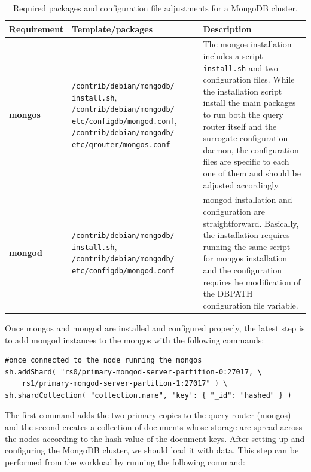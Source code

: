 			\begin{table}[htdp]
				\begin{center}
\caption{Required packages and configuration file adjustments for a MongoDB cluster.}
  \label{tab:common_install_conf_mm}
					\begin{tabular}{R{2.5cm} || L{4.5cm} L{6cm} }
						{\bf Requirement}&{\bf Template/packages}&{\bf Description} \\  
						\hline
						\hline
						{\bf mongos}&\verb|/contrib/debian/mongodb/| \verb|install.sh|, \verb|/contrib/debian/mongodb/| \verb|etc/configdb/mongod.conf|, \verb|/contrib/debian/mongodb/| \verb|etc/qrouter/mongos.conf| & The mongos installation includes a script \verb|install.sh| and two configuration files. While the installation script install the main packages to run both the query router itself and the surrogate configuration daemon, the configuration files are specific to each one of them  and should be adjusted accordingly. \\
						\hline
						{\bf mongod}&\verb|/contrib/debian/mongodb/| \verb|install.sh|, \verb|/contrib/debian/mongodb/| \verb|etc/configdb/mongod.conf| & mongod installation and configuration are straightforward. Basically, the installation requires running the same script for mongos installation and the configuration requires he modification of the DBPATH configuration file variable.\\
					\end{tabular}
				\end{center}
			\end{table}

Once mongos and mongod are installed and configured properly, the latest step is to add mongod instances to the mongos with the following commands:

\begin{lstlisting}
#once connected to the node running the mongos
sh.addShard( "rs0/primary-mongod-server-partition-0:27017, \
    rs1/primary-mongod-server-partition-1:27017" ) \
sh.shardCollection( "collection.name", 'key': { "_id": "hashed" } ) 
\end{lstlisting}

The first command adds the two primary copies to the query router (mongos) and the second creates a collection of documents whose storage are spread across the nodes according to the hash value of the document keys. After setting-up and configuring the MongoDB cluster, we should load it with data. This step can be performed from the workload by running the following command:

